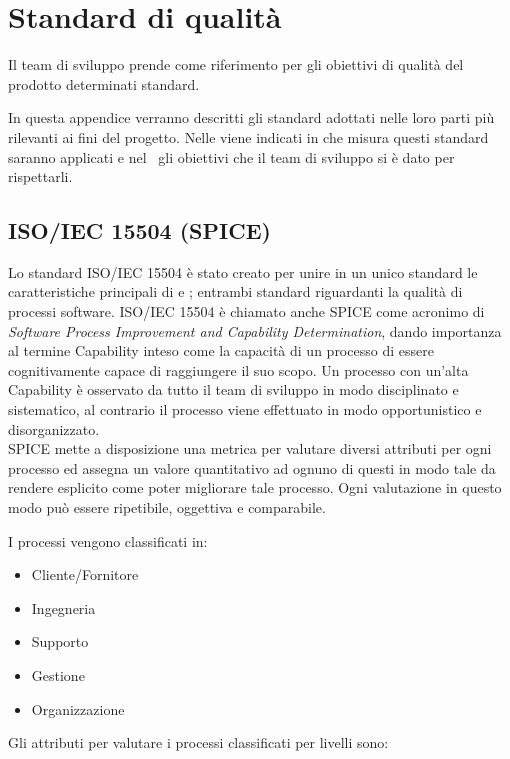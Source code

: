 \newpage
\section{Standard di qualità}
Il team di sviluppo prende come riferimento per gli obiettivi di qualità del prodotto determinati standard.

In questa appendice verranno descritti gli standard adottati nelle loro parti più rilevanti ai fini del progetto. Nelle \Doc{\NdP} viene indicati in che misura questi standard saranno applicati e nel \PdQ~gli obiettivi che il team di sviluppo si è dato per rispettarli.

	\subsection{ISO/IEC 15504 (SPICE)}
	Lo standard ISO/IEC 15504 è stato creato per unire in un unico standard le caratteristiche principali di  e ; entrambi standard riguardanti la qualità di processi software.
	ISO/IEC 15504 è chiamato anche SPICE come acronimo di \textit{Software Process Improvement and Capability Determination}, dando importanza al termine Capability inteso come la capacità di un processo di essere cognitivamente capace di raggiungere il suo scopo. Un processo con un'alta Capability è osservato da tutto il team di sviluppo in modo disciplinato e sistematico, al contrario il processo viene effettuato in modo opportunistico e disorganizzato.\\
	
	SPICE mette a disposizione una metrica per valutare diversi attributi per ogni processo ed assegna un valore quantitativo ad ognuno di questi in modo tale da rendere esplicito come poter migliorare tale processo. Ogni valutazione in questo modo può essere ripetibile, oggettiva e comparabile.
	
	I processi vengono classificati in:
	
	\begin{itemize}
		\item Cliente/Fornitore
		\item Ingegneria
		\item Supporto
		\item Gestione
		\item Organizzazione
	\end{itemize}
	
	Gli attributi per valutare i processi classificati per livelli sono:
	
